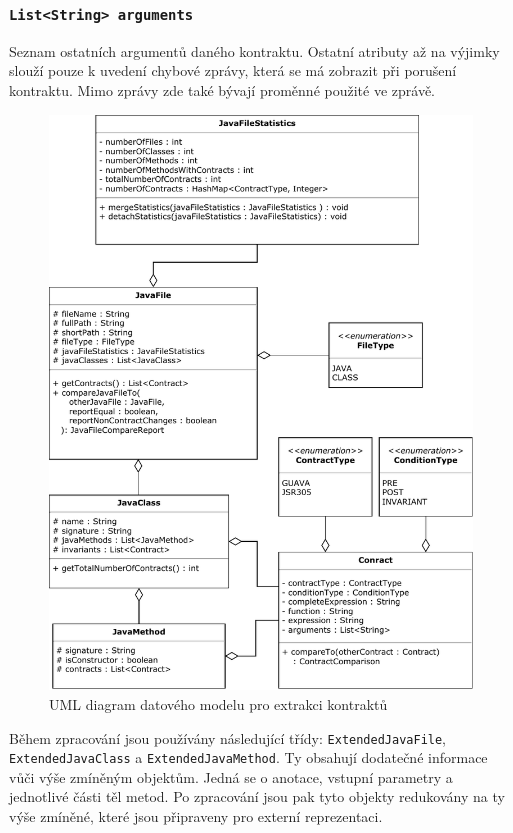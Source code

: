 				\subsubsection{\texttt{List<String> arguments}} 
					Seznam ostatních argumentů daného kontraktu. Ostatní atributy až na výjimky slouží pouze k uvedení chybové zprávy, která se má zobrazit při porušení kontraktu. Mimo zprávy zde také bývají proměnné použité ve zprávě.\\					
	
				
				\begin{figure}[!htb]
						\centering
						\includegraphics[width=1\textwidth]{img/modelExtractorDiagram.pdf}
						\caption[modelExtractorDiagram]{UML diagram datového modelu pro extrakci kontraktů}
						\label{modelExtractorDiagram}
					\endminipage\hfill
				\end{figure}				
					
	
		Během zpracování jsou používány následující třídy: \texttt{ExtendedJavaFile}, \texttt{ExtendedJavaClass} a \texttt{ExtendedJavaMethod}. Ty obsahují dodatečné informace vůči výše zmíněným objektům. Jedná se o anotace, vstupní parametry a jednotlivé části těl metod. Po zpracování jsou pak tyto objekty redukovány na ty výše zmíněné, které jsou připraveny pro externí reprezentaci.
		

